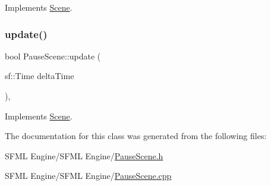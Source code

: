 Implements \hyperlink{class_scene_af25e4d2c998aca4e95899fb67488e815}{Scene}.

\hypertarget{class_pause_scene_a8504260009b4dfb2380785e938e60b4b}{}\label{class_pause_scene_a8504260009b4dfb2380785e938e60b4b} 
\subsubsection{\texorpdfstring{update()}{update()}}
{\footnotesize\ttfamily bool Pause\+Scene\+::update (\begin{DoxyParamCaption}\item[{sf\+::\+Time}]{delta\+Time }\end{DoxyParamCaption})\hspace{0.3cm}{\ttfamily [override]}, {\ttfamily [virtual]}}



Implements \hyperlink{class_scene_a72683c984a1da2ce4f757705e93730f2}{Scene}.



The documentation for this class was generated from the following files\+:\begin{DoxyCompactItemize}
\item 
S\+F\+M\+L Engine/\+S\+F\+M\+L Engine/\hyperlink{_pause_scene_8h}{Pause\+Scene.\+h}\item 
S\+F\+M\+L Engine/\+S\+F\+M\+L Engine/\hyperlink{_pause_scene_8cpp}{Pause\+Scene.\+cpp}\end{DoxyCompactItemize}

